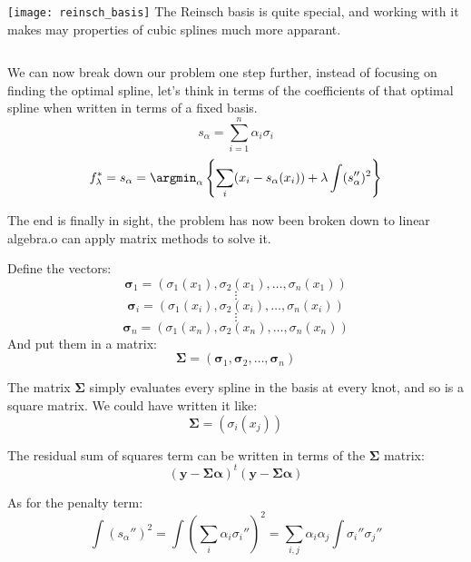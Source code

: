 %
%
\begin{frame}
  \begin{columns}
      \texttt{[image: reinsch\_basis]}
      The Reinsch basis is quite special, and working with it makes may properties of cubic splines much more apparant.
  \end{columns}
  
\end{frame}

\begin{frame}
  We can now break down our problem one step further, instead of focusing on finding the optimal spline, let's think in terms of the coefficients of that optimal spline when written in terms of a fixed basis.
    $$ s_{\alpha} = \sum_{i=1}^{n} \alpha_i \sigma_i $$
    $$ f_{\lambda}^* = s_{\alpha} = \argmin_{\alpha} \left\{ \sum_i (x_i - s_{\alpha}(x_i)) + \lambda \int (s_{\alpha}'')^2 \right\} $$
\end{frame}
%
%
\begin{frame}
  The end is finally in sight, the problem has now been broken down to linear algebra.o can apply matrix methods to solve it.
\end{frame}
%
%
\begin{frame}
  Define the vectors:
  $$ \mathbf{\sigma}_1 = (\sigma_1(x_1), \sigma_2(x_1), \ldots, \sigma_n(x_1)) $$
  $$ \vdots $$
  $$ \mathbf{\sigma}_i = (\sigma_1(x_i), \sigma_2(x_i), \ldots, \sigma_n(x_i)) $$
  $$ \vdots $$
  $$ \mathbf{\sigma}_n = (\sigma_1(x_n), \sigma_2(x_n), \ldots, \sigma_n(x_n)) $$
  And put them in a matrix:
  $$ \mathbf{\Sigma} = (\mathbf{\sigma}_1, \mathbf{\sigma}_2,\ldots,\mathbf{\sigma}_n) $$
\end{frame}
%
%
\begin{frame}
  The matrix $\mathbf{\Sigma}$ simply evaluates every spline in the basis at every knot, and so is a square matrix.  We could have written it like:
  $$ \mathbf{\Sigma} = \left( \sigma_i (x_j) \right) $$
\end{frame}
\begin{frame}
  The residual sum of squares term can be written in terms of the $\mathbf{\Sigma}$ matrix:
  $$ (\mathbf{y} - \mathbf{\Sigma} \mathbf{\alpha})^{t}(\mathbf{y} - \mathbf{\Sigma} \mathbf{\alpha})$$
\end{frame}
%
%
\begin{frame}
  As for the penalty term:
  $$ \int (s_{\alpha}'')^2 = \int \left( \sum_i \alpha_i \sigma_i'' \right)^2 = \sum_{i,j} \alpha_i \alpha_j \int \sigma_i'' \sigma_j'' $$
\end{frame}
